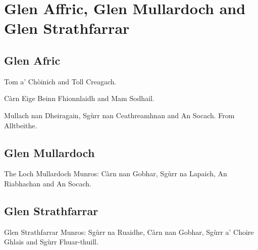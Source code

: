 \section{Glen Affric, Glen Mullardoch and Glen Strathfarrar}


\subsection{Glen Afric}

\begin{munros}
\item
Tom a' Chòinich and Toll Creagach.

\item
Càrn Eige Beinn Fhionnlaidh and Mam Sodhail.

\item
Mullach nan Dheiragain, Sgùrr nan Ceathreamhnan and An Socach.  From
Alltbeithe.
\end{munros}


\subsection{Glen Mullardoch}

\begin{munros}
\item
The Loch Mullardoch Munros: Càrn nan Gobhar, Sgùrr na Lapaich, An Riabhachan
and An Socach.
\end{munros}


\subsection{Glen Strathfarrar}

\begin{munros}
\item
Glen Strathfarrar Munros: Sgùrr na Ruaidhe, Càrn nan Gobhar, Sgùrr a' Choire
Ghlais and Sgùrr Fhuar-thuill.
\end{munros}

